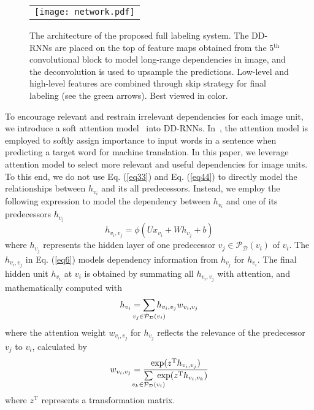 \documentclass[10pt,twocolumn,letterpaper]{article}
\newcommand{\HL}[1]{\textcolor[rgb]{0.00,0.00,0.00}{#1}}
\begin{document}
\begin{figure*}[!htb]
\centering
\begin{tabular}{c}
\texttt{[image: network.pdf]}\\
\end{tabular}
\caption{The architecture of the proposed full labeling system. The DD-RNNs are placed on the top of feature maps obtained from the 5$^{\mathrm{th}}$ convolutional block to model long-range dependencies in image, and the deconvolution is used to upsample the predictions. Low-level and high-level features are combined through skip strategy for final labeling (see the green arrows). Best viewed in color.}
\label{fig:fig3}
\end{figure*}

To encourage relevant and restrain irrelevant dependencies for each image unit, we introduce a soft attention model~\cite{bahdanau2014neural} into DD-RNNs. In~\cite{bahdanau2014neural}, the attention model is employed to softly assign importance to input words in a sentence when predicting a target word for machine translation. In this paper, we leverage attention model to select more relevant and useful dependencies for image units. To this end, we do not use Eq. (\ref{eq33}) and Eq. (\ref{eq44}) to directly model the relationships between $h_{v_i}$ and its all predecessors. Instead, we employ the following expression to model the dependency between $h_{v_i}$ and one of its predecessors $h_{v_j}$
\begin{equation}\label{eq6}
h_{v_i,v_j} = \phi(Ux_{v_i}+Wh_{v_j}+b)
\end{equation}
where $h_{v_j}$ represents the hidden layer of one predecessor $v_j\in\mathcal{P}_{\mathcal{D}}(v_i)$ of $v_i$. The $h_{v_i,v_j}$ in Eq. (\ref{eq6}) models dependency information from $h_{v_j}$ for $h_{v_i}$. The final hidden unit $h_{v_i}$ at $v_i$ is obtained by summating all $h_{v_i,v_j}$ with attention, and mathematically computed with
\begin{equation}\label{eq7}
h_{v_i} = \sum\limits_{\mathclap{v_j\in{\mathcal{P}_{\mathcal{D}}(v_i)}}}{h_{v_i,v_j}w_{v_i,v_j}}
\end{equation}
where the attention weight $w_{v_i,v_j}$ for $h_{v_j}$ reflects the relevance of the predecessor $v_j$ to $v_i$, calculated by
\begin{equation}\label{eq8}
    w_{v_i,v_j} = \frac{\mathrm{exp}(z^{\mathrm{T}}h_{v_i,v_j})}{\sum\limits_{\mathclap{v_k\in{\mathcal{P}_{\mathcal{D}}(v_i)}}} ~\exp(z^{\mathrm{T}}h_{v_i,v_k})}
\end{equation}
where $z^{\mathrm{T}}$ represents a transformation \HL{matrix}.
\end{document}
